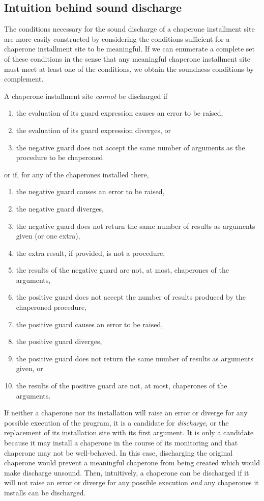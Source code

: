 \documentclass{sigplanconf}
\begin{document}
\subsection{Intuition behind sound discharge}

The conditions necessary for the sound discharge of a chaperone installment site are more easily constructed by considering the conditions sufficient for a chaperone installment site to be meaningful.
If we can enumerate a complete set of these conditions in the sense that any meaningful chaperone installment site must meet at least one of the conditions, we obtain the soundness conditions by complement.

A chaperone installment site \emph{cannot} be discharged if
\begin{enumerate}
\item the evaluation of its guard expression causes an error to be raised,
\item the evaluation of its guard expression diverges, or
\item the negative guard does not accept the same number of arguments as the procedure to be chaperoned
\end{enumerate}
or if, for any of the chaperones installed there,
\begin{enumerate}
\item the negative guard causes an error to be raised,
\item the negative guard diverges,
\item the negative guard does not return the same number of results as arguments given (or one extra),
\item the extra result, if provided, is not a procedure,
\item the results of the negative guard are not, at most, chaperones of the arguments,
\item the positive guard does not accept the number of results produced by the chaperoned procedure,
\item the positive guard causes an error to be raised,
\item the positive guard diverges,
\item the positive guard does not return the same number of results as arguments given, or
\item the results of the positive guard are not, at most, chaperones of the arguments.
\end{enumerate}

If neither a chaperone nor its installation will raise an error or diverge for any possible execution of the program, it is a candidate for \emph{discharge}, or the replacement of its installation site with its first argument.
It is only a candidate because it may install a chaperone in the course of its monitoring and that chaperone may not be well-behaved.
In this case, discharging the original chaperone would prevent a meaningful chaperone from being created which would make discharge unsound.
Then, intuitively, a chaperone can be discharged if it will not raise an error or diverge for any possible execution \emph{and} any chaperones it installs can be discharged.
\end{document}
